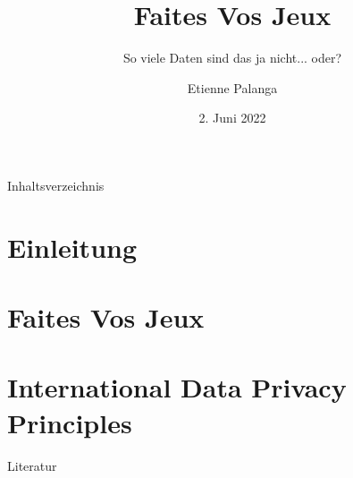 \documentclass[aspectratio=169,10pt, notes]{beamer}
\title{Faites Vos Jeux}
\subtitle{So viele Daten sind das ja nicht... oder?}
\author{Etienne Palanga}
\date{2. Juni 2022}
\institute{TU Dortmund - Fakultät Informatik}
\begin{document}
\maketitle

\begin{frame}{Inhaltsverzeichnis}
    \tableofcontents
\end{frame}


\section{Einleitung}



\section{Faites Vos Jeux \cite{kees_faites_2017}}










\section{International Data Privacy Principles \cite{zankl_international_2014}}





\nocite{mifune}

\begin{frame}{Literatur}
\printbibliography[heading=none]
\end{frame}
\end{document}
